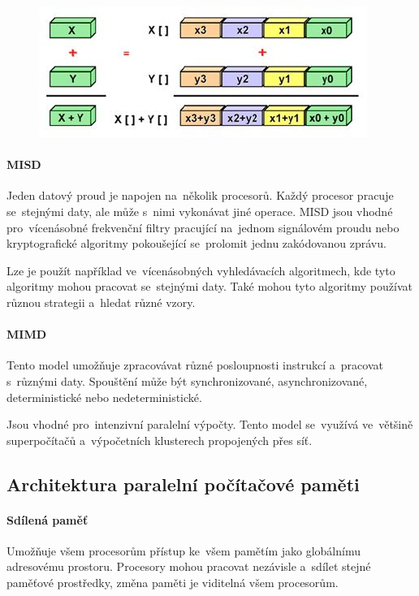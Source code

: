 \begin{figure}[ht]
	\centering
	\includegraphics[scale=0.7]{images/SIMD.JPG}
\end{figure}

\paragraph{MISD}

Jeden datový proud je napojen na~několik procesorů. Každý procesor pracuje se~stejnými daty, ale může s~nimi vykonávat jiné operace. MISD jsou vhodné pro~vícenásobné frekvenční filtry pracující na~jednom signálovém proudu nebo kryptografické algoritmy pokoušející se~prolomit jednu zakódovanou zprávu.

Lze je použít například ve~vícenásobných vyhledávacích algoritmech, kde tyto algoritmy mohou pracovat se~stejnými daty. Také mohou tyto algoritmy používat různou strategii a~hledat různé vzory.

\paragraph{MIMD}

Tento model umožňuje zpracovávat různé posloupnosti instrukcí a~pracovat s~různými daty. Spouštění může být synchronizované, asynchronizované, deterministické nebo nedeterministické.

Jsou vhodné pro~intenzivní paralelní výpočty. Tento model se~využívá ve~většině superpočítačů a~výpočetních klusterech propojených přes síť.

\subsection{Architektura paralelní počítačové paměti}

\paragraph{Sdílená paměť}

Umožňuje všem procesorům přístup ke~všem pamětím jako globálnímu adresovému prostoru. Procesory mohou pracovat nezávisle a~sdílet stejné paměťové prostředky, změna paměti je viditelná všem procesorům.

